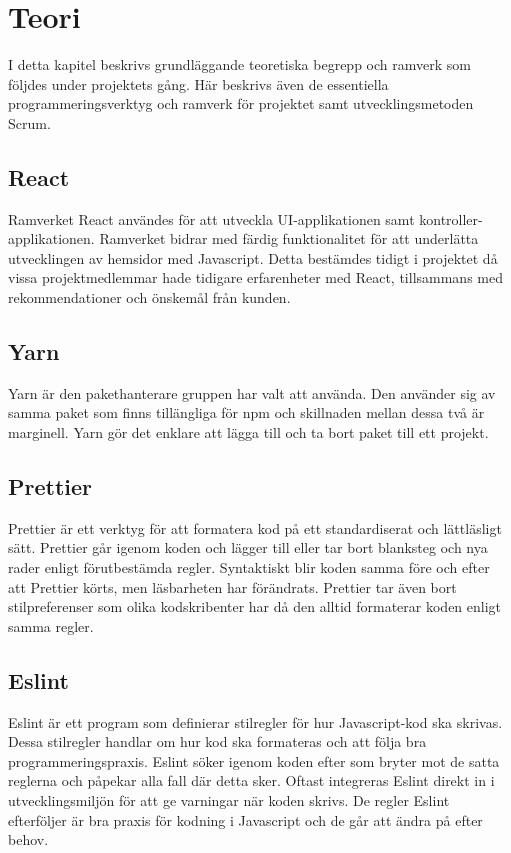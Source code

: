 \chapter{Teori}
\label{cha:theory}
I detta kapitel beskrivs grundläggande teoretiska begrepp och ramverk som följdes under projektets gång. Här beskrivs även de essentiella programmeringsverktyg och ramverk för projektet samt utvecklingsmetoden Scrum.

\section{React}
Ramverket React användes för att utveckla UI-applikationen samt kontroller-applikationen. Ramverket bidrar med färdig funktionalitet för att underlätta utvecklingen av hemsidor med Javascript.  Detta bestämdes tidigt i projektet då vissa projektmedlemmar hade tidigare erfarenheter med React, tillsammans med rekommendationer och önskemål från kunden.~\cite{React}

\section{Yarn}
Yarn är den pakethanterare gruppen har valt att använda. Den använder sig av samma paket som finns tillängliga för npm och skillnaden mellan dessa två är marginell. Yarn gör det enklare att lägga till och ta bort paket till ett projekt.~\cite{Yarn}

\section{Prettier}
Prettier är ett verktyg för att formatera kod på ett standardiserat och lättläsligt sätt. Prettier går igenom koden och lägger till eller tar bort blanksteg och nya rader enligt förutbestämda regler. Syntaktiskt blir koden samma före och efter att Prettier körts, men läsbarheten har förändrats. Prettier tar även bort stilpreferenser som olika kodskribenter har då den alltid formaterar koden enligt samma regler.~\cite{prettier}


\section{Eslint}
Eslint är ett program som definierar stilregler för hur Javascript-kod ska skrivas. Dessa stilregler handlar om hur kod ska formateras och att följa bra programmeringspraxis. Eslint söker igenom koden efter som bryter mot de satta reglerna och påpekar alla fall där detta sker. Oftast integreras Eslint direkt in i utvecklingsmiljön för att ge varningar när koden skrivs. De regler Eslint efterföljer är bra praxis för kodning i Javascript och de går att ändra på efter behov.~\cite{eslint}


